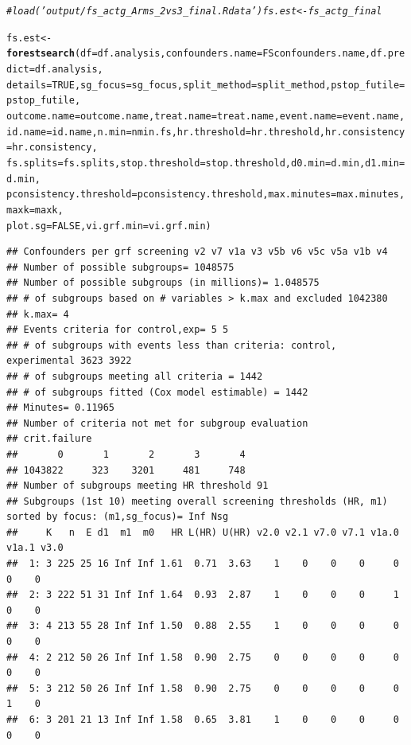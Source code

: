 \documentclass[9pt]{article}\usepackage[]{graphicx}\usepackage[]{xcolor}
\makeatletter
\newcommand{\hlnum}[1]{\textcolor[rgb]{0.686,0.059,0.569}{#1}}%
\newcommand{\hlcom}[1]{\textcolor[rgb]{0.678,0.584,0.686}{\textit{#1}}}%
\newcommand{\hlstd}[1]{\textcolor[rgb]{0.345,0.345,0.345}{#1}}%
\newcommand{\hlkwb}[1]{\textcolor[rgb]{0.69,0.353,0.396}{#1}}%
\newcommand{\hlkwc}[1]{\textcolor[rgb]{0.333,0.667,0.333}{#1}}%
\newcommand{\hlkwd}[1]{\textcolor[rgb]{0.737,0.353,0.396}{\textbf{#1}}}%
\newenvironment{kframe}{%
 \def\at@end@of@kframe{}%
 \ifinner\ifhmode%
  \def\at@end@of@kframe{\end{minipage}}%
  \begin{minipage}{\columnwidth}%
 \fi\fi%
 \def\FrameCommand##1{\hskip\@totalleftmargin \hskip-\fboxsep
 \colorbox{shadecolor}{##1}\hskip-\fboxsep
     \hskip-\linewidth \hskip-\@totalleftmargin \hskip\columnwidth}%
 \MakeFramed {\advance\hsize-\width
   \@totalleftmargin\z@ \linewidth\hsize
   \@setminipage}}%
 {\par\unskip\endMakeFramed%
 \at@end@of@kframe}
\newenvironment{knitrout}{}{} %
\theoremstyle{definition}
\theoremstyle{remark}
\makeatother
\begin{document}
\begin{knitrout}
\begin{kframe}
\begin{alltt}
\hlcom{# load('output/fs_actg_Arms_2vs3_final.Rdata') fs.est<-fs_actg_final}

\hlstd{fs.est} \hlkwb{<-} \hlkwd{forestsearch}\hlstd{(}\hlkwc{df} \hlstd{= df.analysis,} \hlkwc{confounders.name} \hlstd{= FSconfounders.name,} \hlkwc{df.predict} \hlstd{= df.analysis,}
    \hlkwc{details} \hlstd{=} \hlnum{TRUE}\hlstd{,} \hlkwc{sg_focus} \hlstd{= sg_focus,} \hlkwc{split_method} \hlstd{= split_method,} \hlkwc{pstop_futile} \hlstd{= pstop_futile,}
    \hlkwc{outcome.name} \hlstd{= outcome.name,} \hlkwc{treat.name} \hlstd{= treat.name,} \hlkwc{event.name} \hlstd{= event.name,}
    \hlkwc{id.name} \hlstd{= id.name,} \hlkwc{n.min} \hlstd{= nmin.fs,} \hlkwc{hr.threshold} \hlstd{= hr.threshold,} \hlkwc{hr.consistency} \hlstd{= hr.consistency,}
    \hlkwc{fs.splits} \hlstd{= fs.splits,} \hlkwc{stop.threshold} \hlstd{= stop.threshold,} \hlkwc{d0.min} \hlstd{= d.min,} \hlkwc{d1.min} \hlstd{= d.min,}
    \hlkwc{pconsistency.threshold} \hlstd{= pconsistency.threshold,} \hlkwc{max.minutes} \hlstd{= max.minutes,} \hlkwc{maxk} \hlstd{= maxk,}
    \hlkwc{plot.sg} \hlstd{=} \hlnum{FALSE}\hlstd{,} \hlkwc{vi.grf.min} \hlstd{= vi.grf.min)}
\end{alltt}
\begin{verbatim}
## Confounders per grf screening v2 v7 v1a v3 v5b v6 v5c v5a v1b v4 
## Number of possible subgroups= 1048575 
## Number of possible subgroups (in millions)= 1.048575 
## # of subgroups based on # variables > k.max and excluded 1042380 
## k.max= 4 
## Events criteria for control,exp= 5 5 
## # of subgroups with events less than criteria: control, experimental 3623 3922 
## # of subgroups meeting all criteria = 1442 
## # of subgroups fitted (Cox model estimable) = 1442 
## Minutes= 0.11965 
## Number of criteria not met for subgroup evaluation 
## crit.failure
##       0       1       2       3       4 
## 1043822     323    3201     481     748 
## Number of subgroups meeting HR threshold 91 
## Subgroups (1st 10) meeting overall screening thresholds (HR, m1) sorted by focus: (m1,sg_focus)= Inf Nsg 
##     K   n  E d1  m1  m0   HR L(HR) U(HR) v2.0 v2.1 v7.0 v7.1 v1a.0 v1a.1 v3.0
##  1: 3 225 25 16 Inf Inf 1.61  0.71  3.63    1    0    0    0     0     0    0
##  2: 3 222 51 31 Inf Inf 1.64  0.93  2.87    1    0    0    0     1     0    0
##  3: 4 213 55 28 Inf Inf 1.50  0.88  2.55    1    0    0    0     0     0    0
##  4: 2 212 50 26 Inf Inf 1.58  0.90  2.75    0    0    0    0     0     0    0
##  5: 3 212 50 26 Inf Inf 1.58  0.90  2.75    0    0    0    0     0     1    0
##  6: 3 201 21 13 Inf Inf 1.58  0.65  3.81    1    0    0    0     0     0    0

\end{verbatim}
\end{kframe}
\end{knitrout}
\end{document}
